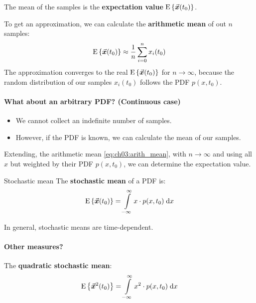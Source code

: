 \begin{refsection}
The mean of the samples is the  \textbf{expectation value} $\mathrm{E}\left\{\vec{\bm{x}}(t_0)\right\}$. 

To get an approximation, we can calculate the  \textbf{arithmetic mean} of out $n$ samples:
\begin{equation}
	\mathrm{E}\left\{\vec{\bm{x}}(t_0)\right\} \approx \frac{1}{n} \sum\limits_{i = 0}^{n} x_i(t_0)
	\label{eq:ch03:arith_mean}
\end{equation}
The approximation converges to the real $\mathrm{E}\left\{\vec{\bm{x}}(t_0)\right\}$ for $n \rightarrow \infty$, because the random distribution of our samples $x_i(t_0)$ follows the \ac{PDF} $p(x, t_0)$.

\paragraph{What about an arbitrary \ac{PDF}? (Continuous case)}

\begin{itemize}
	\item We cannot collect an indefinite number of samples.
	\item However, if the \ac{PDF} is known, we can calculate the mean of our samples.
\end{itemize}

Extending, the arithmetic mean \eqref{eq:ch03:arith_mean}, with $n \rightarrow \infty$ and using all $x$ but weighted by their \ac{PDF} $p(x, t_0)$, we can determine the expectation value.
\begin{definition}{Stochastic mean}
	The  \textbf{stochastic mean} of a \ac{PDF} is:
	\begin{equation}
		\mathrm{E}\left\{\vec{\bm{x}}(t_0)\right\} = \int\limits_{-\infty}^{\infty} x \cdot p(x, t_0) \; \mathrm{d} x
	\end{equation}%
\end{definition}

\begin{fact}
	In general, stochastic means are time-dependent.
\end{fact}

\paragraph{Other measures?}

The  \textbf{quadratic stochastic mean}:
\begin{equation}
	\mathrm{E}\left\{\vec{\bm{x}}^2(t_0)\right\} = \int\limits_{-\infty}^{\infty} x^2 \cdot p(x, t_0) \; \mathrm{d} x
\end{equation}


\end{refsection}
